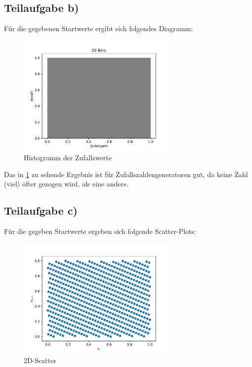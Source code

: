 \subsection{Teilaufgabe b)} \label{sec:6b}
Für die gegebenen Startwerte ergibt sich folgendes Diagramm:
\begin{figure}[H]
  \centering
  \includegraphics[width=0.7\textwidth]{Aufgabe06/Teilaufgabe_b)_Histogramm.pdf}
  \caption{Histogramm der Zufallswerte}
  \label{fig:6bhist}
\end{figure}
Das in \ref{fig:6bhist} zu sehende Ergebnis ist für Zufallszahlengeneratoren gut, da keine Zahl (viel) öfter gezogen wird, als eine andere.

\subsection{Teilaufgabe c)} \label{sec:6c}
Für die gegeben Startwerte ergeben sich folgende Scatter-Plots:
\begin{figure}[H]
  \centering
  \includegraphics[width=0.7\textwidth]{Aufgabe06/Teilaufgabe_c)_2D-Scatter.pdf}
  \caption{2D-Scatter}
  \label{fig:2dscatterd}
\end{figure}

